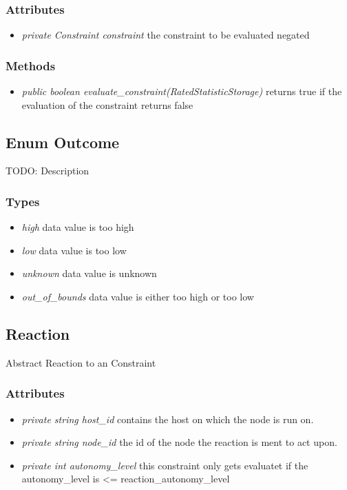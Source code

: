 \subsubsection{Attributes}
\begin{itemize}
	\item \textit{ private Constraint constraint }
	the constraint to be evaluated negated
\end{itemize}
\subsubsection{Methods}
\begin{itemize}
	\item \textit{ public boolean evaluate\_constraint(RatedStatisticStorage) }
	returns true if the evaluation of the constraint returns false
\end{itemize}

\subsection{Enum Outcome }
TODO: Description

\subsubsection{Types}
\begin{itemize}
	\item \textit{ high }
	data value is too high
	\item \textit{ low }
	data value is too low
	\item \textit{ unknown }
	data value is unknown
	\item \textit{ out\_of\_bounds }
	data value is either too high or too low
\end{itemize}


\subsection{Reaction}
	Abstract Reaction to an Constraint
\subsubsection{Attributes}
\begin{itemize}
	\item \textit{ private string host\_id }
		contains the host on which the node is run on.
	\item \textit{ private string node\_id }
		the id of the node the reaction is ment to act upon.
	\item \textit{ private int autonomy\_level }
		this constraint only gets evaluatet if 
		the autonomy\_level is <= reaction\_autonomy\_level
\end{itemize}
